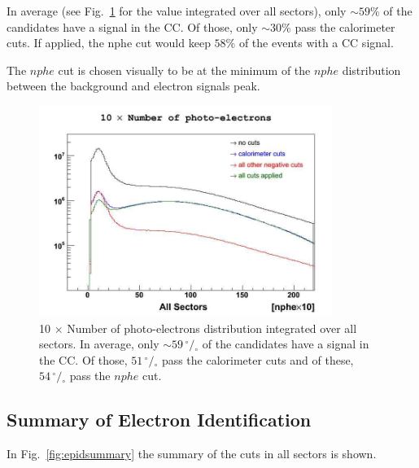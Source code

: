 In average (see Fig.~\ref{fig:cccut_alls} for the value integrated
over all sectors), only $\sim 59\%$ of the candidates have a signal in
the CC. Of those, only $\sim 30\%$ pass the calorimeter cuts. If applied, the nphe cut would keep
$58\%$ of the events with a CC signal.

The $nphe$ cut is chosen visually to be at the minimum
of the $nphe$ distribution between the background and electron signals peak.


\begin{figure}[ht]
  \centering
		\includegraphics[width=0.85\textwidth ]{img/npe_all_sectors.jpg}
		\caption{10 $\times$ Number of photo-electrons distribution integrated over all sectors.
               In average, only $\sim 59 \,^{\circ\!\!}/\!_\circ$ of the candidates have a signal in
               the CC. Of those, $51 \,^{\circ\!\!}/\!_\circ$ pass the calorimeter cuts and of these, 
               $54 \,^{\circ\!\!}/\!_\circ$ pass the $nphe$ cut.}
 		\label{fig:cccut_alls}
\end{figure}
		
\clearpage\newpage




\subsection{Summary of Electron Identification }
In Fig.~\ref{fig:epidsummary} the summary of the cuts in all sectors is shown.

